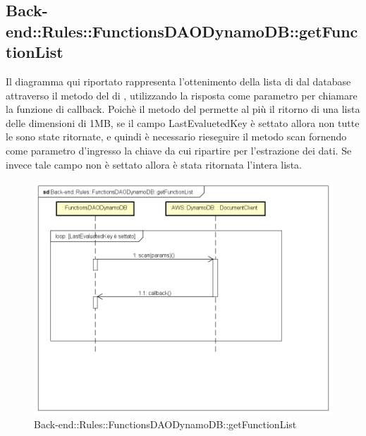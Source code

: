 \subsection{Back-end::Rules::FunctionsDAODynamoDB::getFunctionList}
Il diagramma qui riportato rappresenta l'ottenimento della lista di  dal database attraverso il metodo  del  di , utilizzando la risposta come parametro per chiamare la funzione di callback. Poichè il metodo  del  permette al più il ritorno di una lista delle dimensioni di 1MB, se il campo LastEvaluetedKey è settato allora non tutte le  sono state ritornate, e quindi è necessario rieseguire il metodo scan fornendo come parametro d'ingresso la chiave da cui ripartire per l'estrazione dei dati. Se invece tale campo non è settato allora è stata ritornata l'intera lista.
 \begin{figure}[h] \centering \includegraphics[width=\textwidth,height=\textheight,keepaspectratio]{images/diagrams/back-end/Ufficial_Backend/Back-endRulesFunctionsDAODynamoDBgetFunctionList.png} 	\caption{Back-end::Rules::FunctionsDAODynamoDB::getFunctionList}
\end{figure}
\newpage

